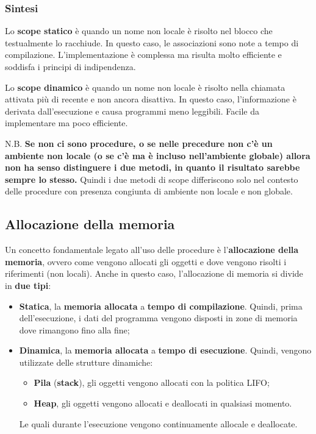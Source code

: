 \documentclass[a4paper]{article}
\begin{document}
 	\subsubsection{Sintesi}
 	Lo \textbf{scope statico} è quando un nome non locale è risolto nel blocco che testualmente lo racchiude. In questo caso, le associazioni sono note a tempo di compilazione. L'implementazione è complessa ma risulta molto efficiente e soddisfa i principi di indipendenza.\newline
 	
 	\noindent
 	Lo \textbf{scope dinamico} è quando un nome non locale è risolto nella chiamata attivata più di recente e non ancora disattiva. In questo caso, l'informazione è derivata dall'esecuzione e causa programmi meno leggibili. Facile da implementare ma poco efficiente.\newline
 	
 	\noindent
 	N.B. \textbf{Se non ci sono procedure, o se nelle precedure non c'è un ambiente non locale (o se c'è ma è incluso nell'ambiente globale) allora non ha senso distinguere i due metodi, in quanto il risultato sarebbe sempre lo stesso.} Quindi i due metodi di scope differiscono solo nel contesto delle procedure con presenza congiunta di ambiente non locale e non globale.\newpage
 	
 	\subsection{Allocazione della memoria}
 	Un concetto fondamentale legato all'uso delle procedure è l'\textbf{allocazione della memoria}, ovvero come vengono allocati gli oggetti e dove vengono risolti i riferimenti (non locali). Anche in questo caso, l'allocazione di memoria si divide in \textbf{due tipi}:
	\begin{itemize}
		\item \textcolor{Red3}{\textbf{Statica}}, la \textbf{memoria allocata} a \textbf{tempo di compilazione}. Quindi, prima dell'esecuzione, i dati del programma vengono disposti in zone di memoria dove rimangono fino alla fine;
		
		\item \textcolor{Red3}{\textbf{Dinamica}}, la \textbf{memoria allocata} a \textbf{tempo di esecuzione}. Quindi, vengono utilizzate delle strutture dinamiche:
		\begin{itemize}
			\item \textbf{Pila} (\textbf{stack}), gli oggetti vengono allocati con la politica LIFO;
			
			\item \textbf{Heap}, gli oggetti vengono allocati e deallocati in qualsiasi momento.
		\end{itemize}
		Le quali durante l'esecuzione vengono continuamente allocale e deallocate.
	\end{itemize}
	
\end{document}
